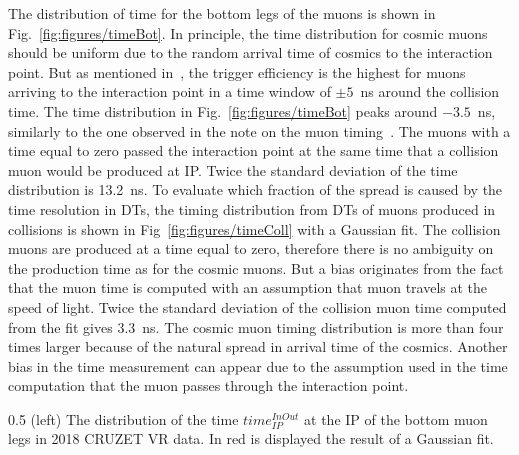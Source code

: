 The distribution of time for the bottom legs of the muons is shown in Fig.~\ref{fig:figures/timeBot}. In principle, the time distribution for cosmic muons should be uniform due to the random arrival time of cosmics to the interaction point. But as mentioned in~\cite{Chatrchyan:2009ig}, the trigger efficiency is the highest for muons arriving to the interaction point in a time window of $\pm 5$~ns around the collision time. The time distribution in Fig.~\ref{fig:figures/timeBot} peaks around $-3.5$~ns, similarly to the one observed in the note on the muon timing~\cite{Traczyk:1365029}. The muons with a time equal to zero passed the interaction point at the same time that a collision muon would be produced at IP. Twice the standard deviation of the time distribution is 13.2~ns. To evaluate which fraction of the spread is caused by the time resolution in DTs, the timing distribution from DTs of muons produced in collisions is shown in Fig~\ref{fig:figures/timeColl} with a Gaussian fit. The collision muons are produced at a time equal to zero, therefore there is no ambiguity on the production time as for the cosmic muons. But a bias originates from the fact that the muon time is computed with an assumption that muon travels at the speed of light. Twice the standard deviation of the collision muon time computed from the fit gives 3.3~ns. The cosmic muon timing distribution is more than four times larger because of the natural spread in arrival time of the cosmics. Another bias in the time measurement can appear due to the assumption used in the time computation that the muon passes through the interaction point.
 

                 {0.5}       %
                 {(left) The distribution of the time $time_{IP}^{InOut}$ at the IP of the bottom muon legs in 2018 CRUZET VR data. In red is displayed the result of a Gaussian fit.  }


